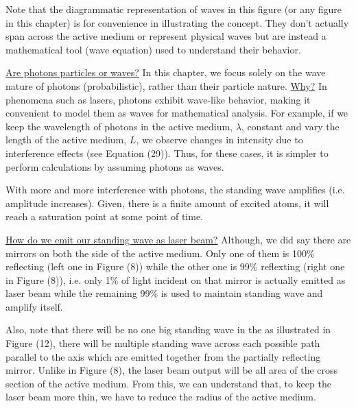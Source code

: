 \documentclass[12pt]{article}
\begin{document}
Note that the diagrammatic representation of waves in this figure (or any figure in this chapter) is for convenience in illustrating the concept. They don't actually span across the active medium or represent physical waves but are instead a mathematical tool (wave equation) used to understand their behavior. \vspace{.2cm}

\uline{Are photons particles or waves?} In this chapter, we focus solely on the wave nature of photons (probabilistic), rather than their particle nature. \uline{Why?} In phenomena such as lasers, photons exhibit wave-like behavior, making it convenient to model them as waves for mathematical analysis. For example, if we keep the wavelength of photons in the active medium, \(\lambda\), constant and vary the length of the active medium, \(L\), we observe changes in intensity due to interference effects (see Equation (29)). Thus, for these cases, it is simpler to perform calculations by assuming photons as waves.
\vspace{.2cm}

With more and more interference with photons, the standing wave amplifies (i.e. amplitude increases). Given, there is a finite amount of excited atoms, it will reach a saturation point at some point of time. \vspace{.2cm}

\uline{How do we emit our standing wave as laser beam?} Although, we did say there are mirrors on both the side of the active medium. Only one of them is 100\% reflecting (left one in Figure (8)) while the other one is 99\% reflexting (right one in Figure (8)), i.e. only 1\% of light incident on that mirror is actually emitted as laser beam while the remaining 99\% is used to maintain standing wave and amplify itself. \vspace{.2cm}

Also, note that there will be no one big standing wave in the  as illustrated in Figure (12), there will be multiple standing wave across each possible path parallel to the axis which are emitted together from the partially reflecting mirror. Unlike in Figure (8), the laser beam output will be all area of the cross section of the active medium. From this, we can understand that, to keep the laser beam more thin, we have to reduce the radius of the active medium.
\end{document}
